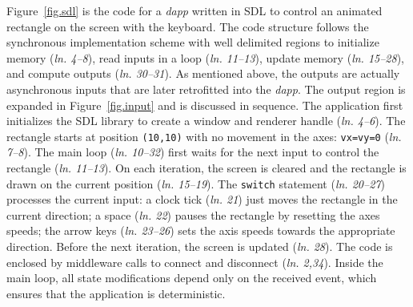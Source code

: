 \documentclass[sigplan,screen]{acmart}
\newcommand{\lin}[1]{(\emph{ln. #1}\xspace)}
\newcommand{\dapp}{\emph{dapp}\xspace}
\begin{document}
Figure~\ref{fig.sdl} is the code for a \dapp written in SDL to control an
animated rectangle on the screen with the keyboard.
The code structure follows the synchronous implementation scheme with well
delimited regions to initialize memory \lin{4--8}, read inputs in a loop
\lin{11--13}, update memory \lin{15--28}, and compute outputs \lin{30--31}.
As mentioned above, the outputs are actually asynchronous inputs that are later
retrofitted into the \dapp.
The output region is expanded in Figure~\ref{fig.input} and is discussed in
sequence.
The application first initializes the SDL library to create a window and
renderer handle \lin{4--6}.
The rectangle starts at position \texttt{(10,10)} with no movement in the axes:
\texttt{vx=vy=0} \lin{7--8}.
The main loop \lin{10--32} first waits for the next input to control the
rectangle \lin{11--13}.
On each iteration, the screen is cleared and the rectangle is drawn on the
current position \lin{15--19}.
The \texttt{switch} statement \lin{20--27} processes the current input:
    a clock tick \lin{21} just moves the rectangle in the current direction;
    a space \lin{22} pauses the rectangle by resetting the axes speeds;
    the arrow keys \lin{23--26} sets the axis speeds towards the appropriate direction.
Before the next iteration, the screen is updated \lin{28}.
The code is enclosed by middleware calls to connect and disconnect \lin{2,34}.
Inside the main loop, all state modifications depend only on the received
event, which ensures that the application is deterministic.
\end{document}

